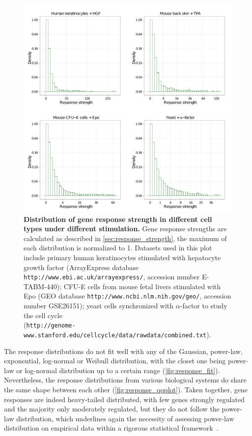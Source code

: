 \begin{figure}[!ht]
\begin{center}
\includegraphics[width=\textwidth]{network/fig/response_all.pdf}
\end{center}
\caption[Heavy-tail distribution of gene response strength]{
{\bf Distribution of gene response strength in different
cell types under different stimulation.}
Gene response strengths are calculated as described in 
\ref{sec:response_strength}, the maximum of each distribution
is normalized to 1. Datasets used in this plot include 
primary human keratinocytes 
stimulated with hepatocyte growth factor (ArrayExpress database 
\texttt{http://www.ebi.ac.uk/arrayexpress/},
accession number E-TABM-440); CFU-E cells from mouse fetal livers stimulated
with Epo (GEO database \texttt{http://www.ncbi.nlm.nih.gov/geo/}, accession
number GSE26151); yeast cells synchronized with 
$\alpha$-factor to study the cell cycle
\\(\texttt{http://genome-www.stanford.edu/cellcycle/data/rawdata/combined.txt}).
}
\label{fig:response_strength}
\end{figure}

The response distributions do not fit well with any of the 
Gaussian, power-law, exponential, log-normal or Weibull distribution, with the closet one being power-law or log-normal
distribution up to a certain range (\ref{fig:response_fit}). 
Nevertheless, the response distributions from various 
biological systems do share the same shape between each 
other (\ref{fig:response_qqplot}). Taken together, gene
responses are indeed heavy-tailed distributed, with few
genes strongly regulated and the majority only moderately
regulated, but they do not follow the power-law distribution,
which underlines again the necessity of assessing power-law
distribution on empirical data within a rigorous statistical
framework~\citep{Clauset2009}.

